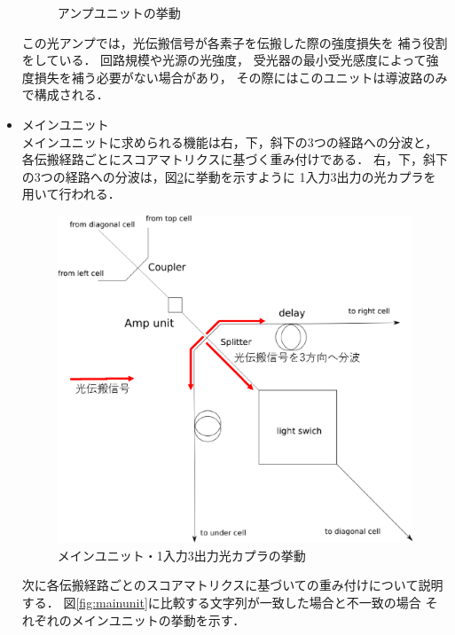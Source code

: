 \begin{itemize}
\begin{figure}[t!]
\begin{center}
\caption{アンプユニットの挙動}
\label{fig:ampunit}
\end{center}
\end{figure}
この光アンプでは，光伝搬信号が各素子を伝搬した際の強度損失を
補う役割をしている．
回路規模や光源の光強度，
受光器の最小受光感度によって強度損失を補う必要がない場合があり，
その際にはこのユニットは導波路のみで構成される．
\item メインユニット\\
メインユニットに求められる機能は右，下，斜下の3つの経路への分波と，
各伝搬経路ごとにスコアマトリクスに基づく重み付けである．
右，下，斜下の3つの経路への分波は，図\ref{fig:mainunit_s}に挙動を示すように
1入力3出力の光カプラを用いて行われる．\\
\begin{figure}[t!]
\begin{center}
\includegraphics[keepaspectratio,scale=0.4]{fig/3/lightracelogic_cell_6_3.eps}
\caption{メインユニット・1入力3出力光カプラの挙動}
\label{fig:mainunit_s}
\end{center}
\end{figure}
次に各伝搬経路ごとのスコアマトリクスに基づいての重み付けについて説明する．
図\ref{fig:mainunit}に比較する文字列が一致した場合と不一致の場合
それぞれのメインユニットの挙動を示す．\\
\begin{figure}[t!]
\begin{center}
\subfigure[比較する文字列が一致した場合のメインユニットの挙動]{
}
\end{center}
\end{figure}
\end{itemize}
